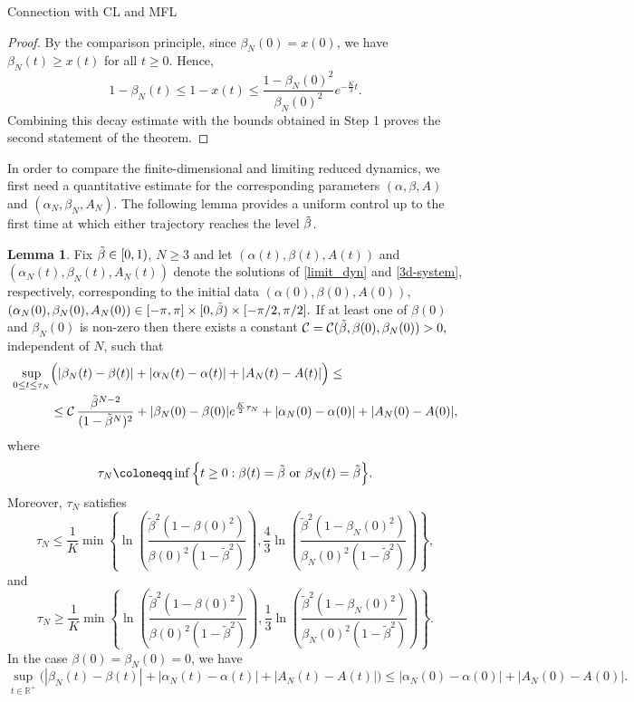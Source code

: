\documentclass{article}
\theoremstyle{definition}
\newtheorem{lemma}[definition]{Lemma}
\renewcommand{\inf}{\mathop{\mathrm{inf}\vphantom{\mathrm{sup}}}}
\newcommand{\R}{\mathbb{R}}
\begin{document}
\begin{section}{Connection with CL and MFL}
\begin{proof}
        By the comparison principle, since $\beta_N(0)=x(0)$, we have $\beta_N(t)\geq x(t)$ for all $t\geq0$. Hence,
        $$ 1-\beta_N(t) \leq 1-x(t) \leq \frac{1-\beta_N(0)^2}{\beta_N(0)^2} e^{-\frac{K}{3}t}. $$
        Combining this decay estimate with the bounds obtained in Step 1 proves the second statement of the theorem.
        \end{proof}
        In order to compare the finite-dimensional and limiting reduced dynamics, we first need a quantitative estimate for the corresponding parameters $(\alpha,\beta,A)$ and $(\alpha_N,\beta_N,A_N)$. The following lemma provides a uniform control up to the first time at which either trajectory reaches the level $\Tilde{\beta}$.
        \begin{lemma}\label{estimate_finite_dim_parameters}
        Fix $\Tilde{\beta}\in[0,1)$, $N\geq3$ and let $(\alpha(t),\beta(t),A(t))$ and $(\alpha_N(t),\beta_N(t),A_N(t))$ denote the solutions of \eqref{limit_dyn} and \eqref{3d-system}, respectively, corresponding to the initial data $ (\alpha(0),\beta(0),A(0)),$ $ (\alpha_N(0),\beta_N(0),A_N(0)) \in[-\pi,\pi]\times[0,\Tilde{\beta})\times[-\pi/2,\pi/2].$ If at least one of $\beta(0)$ and $\beta_N(0)$ is non-zero then there exists a constant $\mathcal{C}=\mathcal{C}(\Tilde{\beta},\beta(0),\beta_N(0))>0,$ independent of $N$, such that
        \begin{align*}
             \sup_{0\leq t\leq\tau_N} &\Big( |\beta_N(t)-\beta(t)| + |\alpha_N(t)-\alpha(t)| + |A_N(t)-A(t)| \Big) \leq \\
             &\leq\mathcal{C}\, \frac{\Tilde{\beta}^{N-2}} {(1-\Tilde{\beta}^N)^2}+|\beta_N(0)-\beta(0)|e^{\frac{K}{2}\tau_N}+|\alpha_N(0)-\alpha(0)|+|A_N(0)-A(0)|,
        \end{align*}
        where
        $$ \tau_N\coloneqq \inf\Big\{ t\geq0: \beta(t)=\Tilde{\beta} \ \text{or}\ \beta_N(t)=\Tilde{\beta} \Big\}. $$
        Moreover, $\tau_N$ satisfies
        $$\tau_N\leq\frac{1}{K}\min\left\{\ln\left(\frac{\tilde{\beta}^2(1-\beta(0)^2)}{\beta(0)^2(1-\tilde{\beta}^2)}\right),\frac{4}{3}\ln\left(\frac{\tilde{\beta}^2(1-\beta_N(0)^2)}{\beta_N(0)^2(1-\tilde{\beta}^2)}\right)\right\},$$
        and
        $$\tau_N\geq\frac{1}{K}\min\left\{\ln\left(\frac{\tilde{\beta}^2(1-\beta(0)^2)}{\beta(0)^2(1-\tilde{\beta}^2)}\right),\frac{1}{3}\ln\left(\frac{\tilde{\beta}^2(1-\beta_N(0)^2)}{\beta_N(0)^2(1-\tilde{\beta}^2)}\right)\right\}.$$
        In the case $\beta(0)=\beta_N(0)=0$, we have
        $$\sup_{t\in\R^+}\Big( |\beta_N(t)-\beta(t)| + |\alpha_N(t)-\alpha(t)| + |A_N(t)-A(t)| \Big)\leq|\alpha_N(0)-\alpha(0)|+|A_N(0)-A(0)|.$$

\end{lemma}
\end{section}
\end{document}

